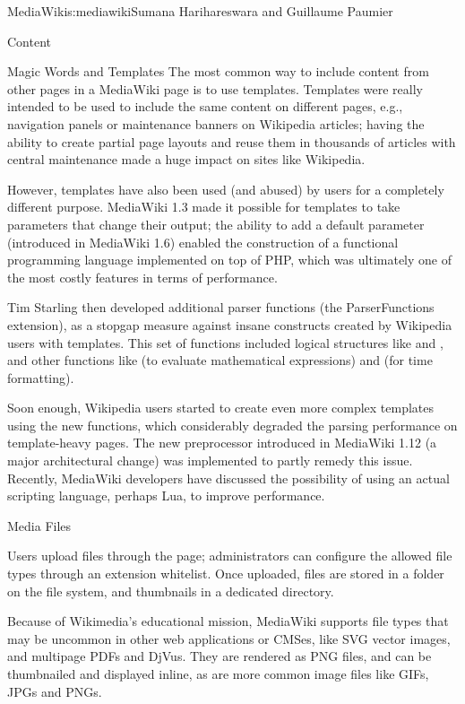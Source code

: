 \begin{aosachapter}{MediaWiki}{s:mediawiki}{Sumana Harihareswara and Guillaume Paumier}
\begin{aosasect1}{Content}
\begin{aosasect2}{Magic Words and Templates}
The most common way to include content from other pages in a MediaWiki
page is to use templates. Templates were really intended to be used to
include the same content on different pages, e.g., navigation panels or
maintenance banners on Wikipedia articles; having the ability to
create partial page layouts and reuse them in thousands of articles
with central maintenance made a huge impact on sites like Wikipedia.

However, templates have also been used (and abused) by users for a
completely different purpose. MediaWiki 1.3 made it possible for
templates to take parameters that change their output; the ability to
add a default parameter (introduced in MediaWiki 1.6) enabled the
construction of a functional programming language implemented on top
of PHP, which was ultimately one of the most costly features in terms
of performance.

Tim Starling then developed additional parser functions (the
ParserFunctions extension), as a stopgap measure against insane
constructs created by Wikipedia users with templates. This set of
functions included logical structures like  and
, and other functions like  (to evaluate
mathematical expressions) and  (for time formatting).

Soon enough, Wikipedia users started to create even more complex
templates using the new functions, which considerably degraded the
parsing performance on template-heavy pages. The new preprocessor
introduced in MediaWiki 1.12 (a major architectural change) was
implemented to partly remedy this issue. Recently, MediaWiki
developers have discussed the possibility of using an actual scripting
language, perhaps Lua, to improve performance.

\end{aosasect2}

\begin{aosasect2}{Media Files}

Users upload files through the  page;
administrators can configure the allowed file types through an
extension whitelist. Once uploaded, files are stored in a folder on
the file system, and thumbnails in a dedicated  directory.

Because of Wikimedia's educational mission, MediaWiki supports file
types that may be uncommon in other web applications or CMSes, like
SVG vector images, and multipage PDFs and DjVus. They are rendered
as PNG files, and can be thumbnailed and displayed inline, as are more
common image files like GIFs, JPGs and PNGs.


\end{aosasect2}
\end{aosasect1}
\end{aosachapter}
